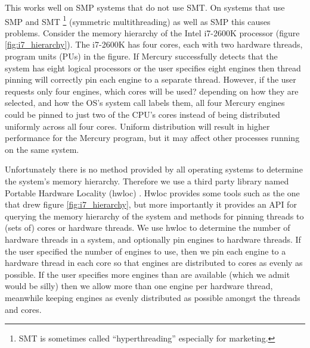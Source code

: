 This works well on SMP systems that do not use SMT.
On systems that use SMP and SMT
\footnote{
    SMT is sometimes called ``hyperthreading'' especially for marketing.}
(symmetric multithreading) as well as SMP this causes problems.
Consider the memory hierarchy of the Intel i7-2600K processor
(figure \ref{fig:i7_hierarchy}).
The i7-2600K has four cores, each with two hardware threads,
program units (PUs) in the figure.
If Mercury successfully detects that the system has eight logical processors
or the user specifies eight engines then thread pinning will correctly pin
each engine to a separate thread.
However,
if the user requests only four engines, which cores will be used?
depending on how they are selected,
and how the OS's  system call labels them,
all four Mercury engines could be pinned to just two of the CPU's cores
instead of being distributed uniformly across all four cores.
Uniform distribution will result in higher performance for the Mercury
program,
but it may affect other processes running on the same system.

Unfortunately there is no method provided by all operating systems to
determine the system's memory hierarchy.
Therefore we use a third party library
named Portable Hardware Locality (hwloc) \citep{broquedis:2010:hwloc}.
Hwloc provides some tools such as the one that drew figure
\ref{fig:i7_hierarchy},
but more importantly it provides an API for querying the memory hierarchy of
the system and methods for pinning threads to (sets of) cores or hardware
threads.
We use hwloc to determine the number of hardware threads in a system,
and optionally pin engines to hardware threads.
If the user specified the number of engines to use,
then we pin each engine to a hardware thread in each core so that engines
are distributed to cores as evenly as possible.
If the user specifies more engines than are available
(which we admit would be silly) then we allow more than one engine per
hardware thread,
meanwhile keeping engines as evenly distributed as possible amongst the
threads and cores.



